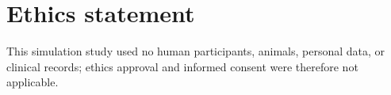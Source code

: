 \section*{Ethics statement}

This simulation study used no human participants, animals, personal data, or
clinical records; ethics approval and informed consent were therefore not
applicable.
